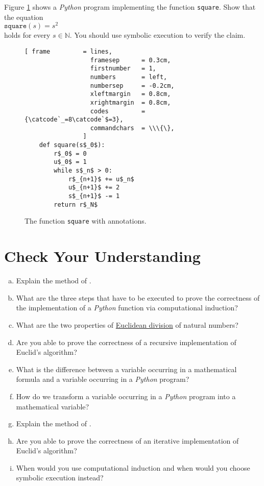 \exerciseEng
Figure \ref{fig:square-iterative} shows a \textsl{Python} program implementing the function \texttt{square}.  Show that the equation
\\[0.2cm]
\hspace*{1.3cm}
$\mathtt{square}(s) = s^2$
\\[0.2cm]
holds for every $s \in \mathbb{N}$.  You should use symbolic execution to verify the claim.
\eox

\begin{figure}[!ht]
\centering
\begin{Verbatim}[ frame         = lines, 
                  framesep      = 0.3cm, 
                  firstnumber   = 1,
                  numbers       = left,
                  numbersep     = -0.2cm,
                  xleftmargin   = 0.8cm,
                  xrightmargin  = 0.8cm,
                  codes         = {\catcode`_=8\catcode`$=3},
                  commandchars  = \\\{\},
                ]
    def square(s$_0$):
        r$_0$ = 0
        u$_0$ = 1
        while s$_n$ > 0:
            r$_{n+1}$ += u$_n$
            u$_{n+1}$ += 2
            s$_{n+1}$ -= 1
        return r$_N$
\end{Verbatim}
\vspace*{-0.3cm}
\caption{The function \texttt{square} with annotations.}
\label{fig:square-iterative}
\end{figure}

\pagebreak

\section{Check Your Understanding}
\begin{enumerate}[(a)]
\item Explain the method of .  
\item What are the three steps that have to be executed to prove the correctness of the implementation of a
      \textsl{Python} function via computational induction?
\item What are the two properties of \href{https://en.wikipedia.org/wiki/Euclidean_division}{Euclidean division} of natural numbers?
\item Are you able to prove the correctness of a recursive implementation of Euclid's algorithm?
\item What is the difference between a variable occurring in a mathematical formula and a variable occurring in
      a \textsl{Python} program?
\item How do we transform a variable occurring in a \textsl{Python} program into a mathematical variable?
\item Explain the method of .
\item Are you able to prove the correctness of an iterative implementation of Euclid's algorithm?
\item When would you use computational induction and when would you choose symbolic execution instead?
\end{enumerate}

